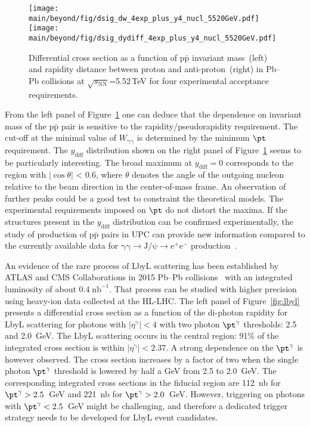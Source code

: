 \begin{figure}[!h]
        \texttt{[image: \\main/beyond/fig/dsig\_dw\_4exp\_plus\_y4\_nucl\_5520GeV.pdf]}
        \texttt{[image: \\main/beyond/fig/dsig\_dydiff\_4exp\_plus\_y4\_nucl\_5520GeV.pdf]}
        \caption{
                Differential cross section as a function of $\mathrm{p\bar{p}}$
                invariant mass~(left) and rapidity
                distance between proton and anti-proton~(right)
                in Pb--Pb collisions at $\sqrt{s_{\mathrm{NN}}}$=5.52\,TeV
                for four experimental acceptance requirements.
        }
        \label{fig:ppbar}
\end{figure}


From the left panel of Figure~\ref{fig:ppbar} one can deduce that the dependence on invariant mass of the $\mathrm{p\bar{p}}$ pair is sensitive to the rapidity/pseudorapidity requirement. The cut-off at the minimal value of $W_{\mathrm{\gamma\gamma}}$ is determined by the minimum $\pt$ requirement.
The $y_{\mathrm{diff}}$ distribution shown on the right panel of Figure~\ref{fig:ppbar} seems to be particularly interesting. 
The broad maximum at $y_{\mathrm{diff}}=0$ corresponds to the region with $|\cos \theta|$ < 0.6, where $\theta$ denotes the angle of the outgoing nucleon relative to the beam direction in the center-of-mass frame. An observation of further peaks could be a good test to constraint the theoretical models. The experimental requirements imposed on $\pt$ do not distort the maxima. If the structures present in the $y_{\mathrm{diff}}$ distribution can be confirmed experimentally, the study of production of $\mathrm{p\bar{p}}$ pairs
in UPC can provide new information compared to the currently available data for $\mathrm{\gamma\gamma\rightarrow J/\psi \rightarrow e^+e^-}$ production~\cite{Kryshen:2017jfz,Abbas:2013oua}.


An evidence of the rare process of LbyL scattering has been established by ATLAS and CMS Collaborations in 2015 Pb--Pb collisions~\cite{Aaboud:2017bwk,Sirunyan:2018fhl} with an integrated luminosity of about $0.4\;\mathrm{nb}^{-1}$. That process can be studied with higher precision using heavy-ion data collected at the HL-LHC. The left panel of Figure~\ref{fig:lbyl} presents a differential cross section as a function of the di-photon rapidity for LbyL scattering for photons with $|\eta^{\mathrm{\gamma}}|<4$ with two photon $\pt^{\mathrm{\gamma}}$ thresholds: 2.5 and 2.0~GeV. The LbyL scattering occurs in the central region: 91\% of the integrated cross section is within $|\eta^{\mathrm{\gamma}}|<2.37$. A strong dependence on the $\pt^{\mathrm{\gamma}}$ is however observed. The cross section increases by a factor of two when the single photon $\pt^{\mathrm{\gamma}}$ threshold is lowered by half a GeV from 2.5 to 2.0~GeV. The corresponding integrated cross sections in the fiducial region are 112~nb for $\pt^{\mathrm{\gamma}}>2.5$~GeV and 221~nb for $\pt^{\mathrm{\gamma}}>2.0$~GeV. However, triggering on photons with $\pt^{\mathrm{\gamma}}<2.5$~GeV might be challenging, and therefore a dedicated trigger strategy needs to be developed for LbyL event candidates.

